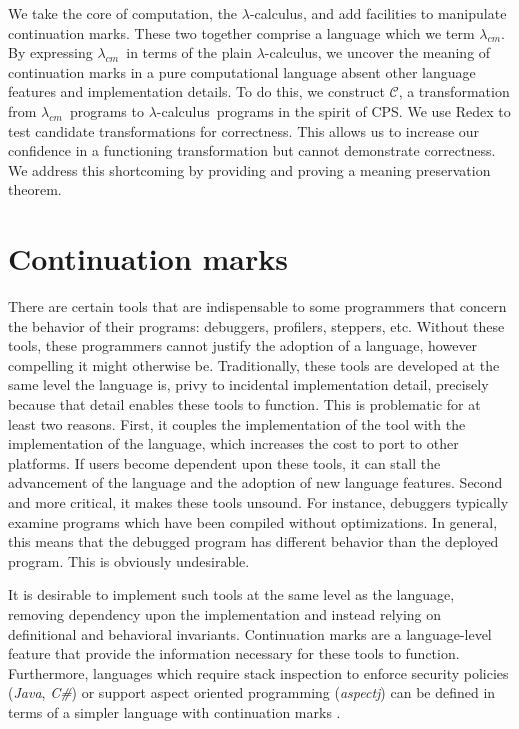 \documentclass[ms,electronic,twosidetoc,letterpaper,chaptercenter,parttop]{byumsphd}
\newcommand{\lc}{$\lambda$-calculus}
\newcommand{\cm}{$\lambda_{cm}$}
\begin{document}
We take the core of computation, the \lc, and add facilities to manipulate continuation
marks. These two together comprise a language which we term \cm. By expressing \cm\ in
terms of the plain \lc, we uncover the meaning of continuation marks in a pure
computational language absent other language features and implementation details. To do
this, we construct $\mathcal{C}$, a transformation from \cm\ programs to \lc\ programs in
the spirit of CPS. We use Redex \cite{findler2010redex} to test candidate transformations
for correctness. This allows us to increase our confidence in a functioning transformation
but cannot demonstrate correctness. We address this shortcoming by providing and proving a
meaning preservation theorem.

\chapter{Continuation marks}

There are certain tools that are indispensable to some programmers that concern the
behavior of their programs: debuggers, profilers, steppers, etc. Without these tools,
these programmers cannot justify the adoption of a language, however compelling it might
otherwise be. Traditionally, these tools are developed at the same level the language is,
privy to incidental implementation detail, precisely because that detail enables these
tools to function. This is problematic for at least two reasons. First, it couples the
implementation of the tool with the implementation of the language, which increases the
cost to port to other platforms. If users become dependent upon these tools, it can stall
the advancement of the language and the adoption of new language features. Second and more
critical, it makes these tools unsound. For instance, debuggers typically examine programs
which have been compiled without optimizations. In general, this means that the debugged
program has different behavior than the deployed program. This is obviously undesirable.

It is desirable to implement such tools at the same level as the language, removing
dependency upon the implementation and instead relying on definitional and behavioral
invariants. Continuation marks are a language-level feature that provide the information
necessary for these tools to function. Furthermore, languages which require stack
inspection to enforce security policies (\emph{Java}, \emph{C\#}) or support aspect
oriented programming (\emph{aspectj}) can be defined in terms of a simpler language with
continuation marks \cite{clements2004tail}.
\end{document}
